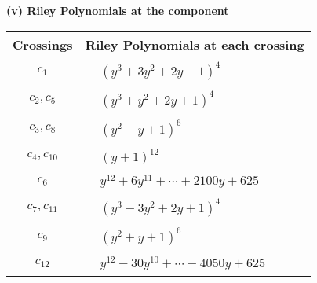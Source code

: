 \documentclass[1p]{elsarticle_modified}
\theoremstyle{definition}
\begin{document}
\newpage\renewcommand{\arraystretch}{1}
\flushleft \textbf{(v) Riley Polynomials at the component}\newline \\
\begin{tabular}{m{50pt}|m{274pt}}
Crossings & \hspace{64pt}Riley Polynomials at each crossing \\
\hline $$\begin{aligned}c_{1}\end{aligned}$$&$\begin{aligned}
&(y^3+3 y^2+2 y-1)^4
\end{aligned}$\\
\hline $$\begin{aligned}c_{2},c_{5}\end{aligned}$$&$\begin{aligned}
&(y^3+y^2+2 y+1)^4
\end{aligned}$\\
\hline $$\begin{aligned}c_{3},c_{8}\end{aligned}$$&$\begin{aligned}
&(y^2- y+1)^6
\end{aligned}$\\
\hline $$\begin{aligned}c_{4},c_{10}\end{aligned}$$&$\begin{aligned}
&(y+1)^{12}
\end{aligned}$\\
\hline $$\begin{aligned}c_{6}\end{aligned}$$&$\begin{aligned}
&y^{12}+6 y^{11}+\cdots+2100 y+625
\end{aligned}$\\
\hline $$\begin{aligned}c_{7},c_{11}\end{aligned}$$&$\begin{aligned}
&(y^3-3 y^2+2 y+1)^4
\end{aligned}$\\
\hline $$\begin{aligned}c_{9}\end{aligned}$$&$\begin{aligned}
&(y^2+y+1)^6
\end{aligned}$\\
\hline $$\begin{aligned}c_{12}\end{aligned}$$&$\begin{aligned}
&y^{12}-30 y^{10}+\cdots-4050 y+625
\end{aligned}$\\
\hline
\end{tabular}\\~\\
\end{document}
